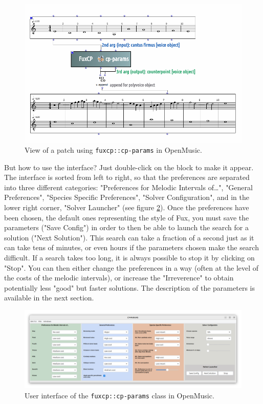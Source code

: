 \begin{figure}[h]
    \centering
    \includegraphics[width=5.2in]{Images/om_ext_interface_mod.png}
    \caption{View of a patch using \texttt{fuxcp::cp-params} in OpenMusic.}
    \label{fig:om_ext_interface_mod}
\end{figure}

But how to use the interface? Just double-click on the block to make it appear. The interface is sorted from left to right, so that the preferences are separated into three different categories: "Preferences for Melodic Intervals of\dots", "General Preferences", "Species Specific Preferences", "Solver Configuration", and in the lower right corner, "Solver Launcher" (see figure \ref{fig:om_int_interface}). Once the preferences have been chosen, the default ones representing the style of Fux, you must save the parameters ("Save Config") in order to then be able to launch the search for a solution ("Next Solution"). This search can take a fraction of a second just as it can take tens of minutes, or even hours if the parameters chosen make the search difficult. If a search takes too long, it is always possible to stop it by clicking on "Stop". You can then either change the preferences in a way (often at the level of the costs of the melodic intervals), or increase the "Irreverence" to obtain potentially less "good" but faster solutions. The description of the parameters is available in the next section.

\begin{figure}[h]
    \includegraphics[width=1.4\textwidth, center]{Images/om_int_interface.png}
    \caption{User interface of the \texttt{fuxcp::cp-params} class in OpenMusic.}
    \label{fig:om_int_interface}
\end{figure}

